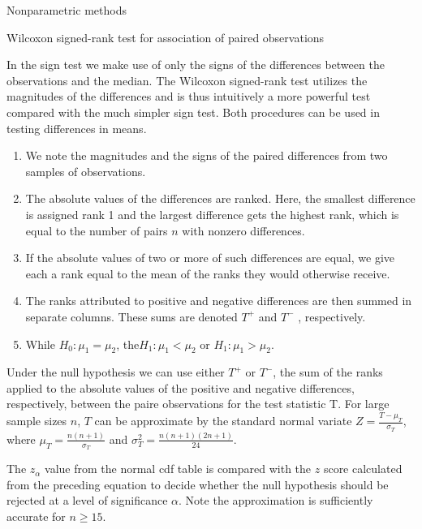 \documentclass[8pt]{beamer}
\renewcommand{\emph}[1]{\textcolor{myorange}{#1}}
\begin{document}
\begin{frame}{Nonparametric methods}

    \begin{block}{Wilcoxon signed-rank test for association of paired observations}
    \end{block}
    In the \emph{sign test} we make use of only the signs of the differences between the observations and the \emph{median}. The \alert{Wilcoxon signed-rank test} utilizes the magnitudes of the differences and is thus intuitively a more powerful test compared with the much simpler \emph{sign test}. Both procedures can be used in testing differences in \emph{means}.
    \begin{enumerate}
        \item We note the magnitudes and the signs of the paired differences from two samples of observations.
        \item The absolute values of the differences are ranked. Here, the smallest difference is assigned rank 1 and the largest difference gets the highest rank, which is equal to the number of pairs $n$ with nonzero differences.
        \item If the absolute values of two or more of such differences are equal, we give each a rank equal to the mean of the ranks they would otherwise receive.
        \item The ranks attributed to positive and negative differences are then summed in separate columns. These sums are denoted $T^+$ and $T^-$ , respectively.
    \item While $H_0 : \mu_1 = \mu_2$, the$H_1 : \mu_1 < \mu_2$ or $H_1 : \mu_1 > \mu_2$. 
    \end{enumerate}
    Under the \emph{null hypothesis} we can use either $T^+$ or $T^-$, the sum of the ranks applied to the absolute values of the positive and negative differences, respectively, between the paire observations for the \emph{test statistic T}. For large sample sizes $n$, $T$ can be approximate by the \emph{standard normal variate} $Z =\frac{T - \mu_T}{\sigma_T} $, where $\mu_T = \frac{n(n+1)}{\sigma_T}$ and $\sigma_T^2 = \frac{n(n+1)(2n+1)}{24}$.

    The $z_{\alpha}$ value from the \emph{normal cdf} table is compared with the $z$ score calculated from   the preceding equation to decide whether the \emph{null hypothesis} should be rejected at a level of significance $\alpha$. Note the approximation is sufficiently accurate for $n \geq 15$.
    \end{frame}
\end{document}
